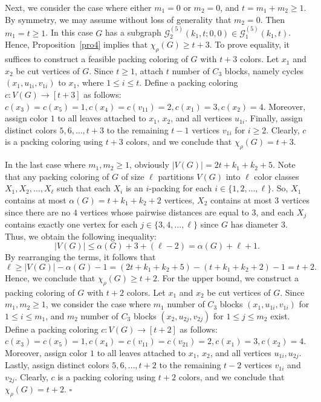 \documentclass[12pt]{article}
\newcommand{\qed}{\hfill $\square$ \bigskip}
\begin{document}
Next, we consider the case where either $m_1 = 0$ or $m_2 = 0$, and $t=m_1+m_2\geq 1$. By symmetry, we may assume without loss of generality that $m_2=0$. Then $m_1 = t \geq 1$. In this case $G$ has a subgraph $\mathcal{G}_{2}^{(5)}(k_{1},t;0,0) \in \mathcal{G}_{1}^{(5)}(k_1, t)$. Hence, Proposition~\ref{pro4} implies that \( \chi_\rho(G) \ge t + 3 \). 
To prove equality, it suffices to construct a feasible packing coloring of \(G\) with $t + 3$ colors.   Let $x_1$ and $x_2$ be cut vertices of $G$.  Since $t \geq 1$, attach $t$ number of $C_3$ blocks, namely cycles $(x_1,u_{1i},v_{1i})$ to $x_1$, where \(1 \le i \le t\). Define a packing coloring $c:V(G)\to [t+3]$ as follows: $c(x_3)=c(x_5)=1, c(x_4)=c(v_{11})=2, c(x_1)=3, c(x_2)=4.$ 
Moreover, assign color $1$ to all leaves attached to $x_1$, $x_2$, and all vertices $u_{1i}$.
Finally, assign distinct colors $5,6,\dots,t+3$ to the remaining $t-1$ vertices $v_{1i}$ for \(i \ge 2\). Clearly, $c$ is a packing coloring using $t+3$ colors, and we conclude that  $\chi_\rho(G) =  t+3$.
	
In the last case where $m_1, m_2 \geq 1$, obviously $|V(G)|=2t+k_1+k_2+5$. Note that any packing coloring of $G$ of size $\ell$ partitions $V(G)$ into $\ell$ color classes $X_1, X_2, \dots, X_{\ell}$ such that each $X_i$ is an $i$-packing for each $i \in \{1, 2, \dots, \ell\}$. So, $X_1$ contains at most $\alpha(G)=t+k_1+k_2+2$ vertices, $X_2$ contains at most $3$ vertices since there are no $4$ vertices whose pairwise distances are equal to $3$, and each $X_j$ contains exactly one vertex for each $j \in \{3, 4, \dots, \ell\}$ since $G$ has diameter $3$. Thus, we obtain the following inequality:
$$|V(G)| \leq \alpha(G) + 3 + (\ell - 2) = \alpha(G) + \ell + 1.$$
By rearranging the terms, it follows that
\[
\ell \geq |V(G)| - \alpha(G) - 1
= (2t+k_1+k_2+5) - (t+k_1+k_2+2) - 1
= t+2.
\]
	Hence, we conclude that $\chi_{\rho}(G) \geq t+2.$
For the upper bound, we construct a packing coloring of $G$ with $t+2$ colors. Let $x_1$ and $x_2$ be cut vertices of $G$. Since $ m_1, m_2 \geq 1$, we consider the case where $m_1$ number of $C_3$ blocks 
$(x_1,u_{1i},v_{1i})$ for $1 \leq i \leq m_1$, and $m_2$ number of $C_3$ blocks $(x_2,u_{2j},v_{2j})$ for $1 \leq j \leq m_2$ exist. Define a packing coloring $c:V(G)\to[t+2]$ as follows: $c(x_3)=c(x_5)=1, c(x_4)=c(v_{11})=c(v_{21})=2, c(x_1)=3, c(x_2)=4.$ Moreover, assign color $1$ to all leaves attached to $x_1$, $x_2$, and all vertices $u_{1i}, u_{2j}$.
Lastly, assign distinct colors $5,6,\dots,t+2$ to the remaining $t-2$ vertices $v_{1i}$ and $v_{2j}$. Clearly, $c$ is a packing coloring using $t+2$ colors, and we conclude that  $\chi_\rho(G) =  t+2$. 
\qed
\end{document}

